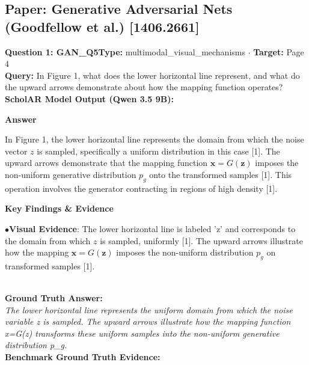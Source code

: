 \documentclass[10pt,a4paper]{article}
\begin{document}
\subsection{Paper: Generative Adversarial Nets (Goodfellow et al.) [1406.2661]}
\vspace{-4pt}
\begin{tcolorbox}[questionbox]
{\noindent\bfseries\large\color{navy} Question 1: GAN\_Q5}\hfill {\footnotesize\color{darkteal}\textbf{Type:} multimodal\_visual\_mechanisms $\cdot$ \textbf{Target:} Page 4}\\[4pt]
{\noindent\bfseries\color{accentblue} Query: } In Figure 1, what does the lower horizontal line represent, and what do the upward arrows demonstrate about how the mapping function operates?\\[6pt]
{\noindent\bfseries\color{navy} ScholAR Model Output (Qwen 3.5 9B):}\\[2pt]
{\small \noindent \textbf{Answer}\par\vspace{3pt}In Figure 1, the lower horizontal line represents the domain from which the noise vector $z$ is sampled, specifically a uniform distribution in this case [1]. The upward arrows demonstrate that the mapping function $\mathbf{x} = G(\mathbf{z})$ imposes the non-uniform generative distribution $p_g$ onto the transformed samples [1]. This operation involves the generator contracting in regions of high density [1].\par\vspace{3pt}\noindent \textbf{Key Findings \& Evidence}\par\vspace{3pt}\noindent\hspace*{8pt}$\bullet$\hspace*{4pt}\textbf{Visual Evidence}: The lower horizontal line is labeled 'z' and corresponds to the domain from which $z$ is sampled, uniformly [1]. The upward arrows illustrate how the mapping $\mathbf{x} = G(\mathbf{z})$ imposes the non-uniform distribution $p_g$ on transformed samples [1].}\\[6pt]
{\noindent\bfseries\color{darkteal} Ground Truth Answer:}\\[2pt]
{\small\itshape The lower horizontal line represents the uniform domain from which the noise variable z is sampled. The upward arrows illustrate how the mapping function x=G(z) transforms these uniform samples into the non-uniform generative distribution p\_g.}\\[4pt]
{\noindent\bfseries\color{darkteal} Benchmark Ground Truth Evidence:}\\[2pt]

\end{tcolorbox}
\end{document}
